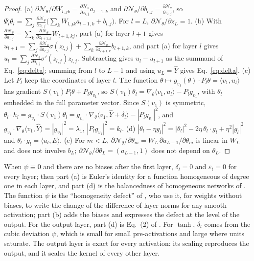 \documentclass[11pt]{article}
\theoremstyle{definition}
\theoremstyle{remark}
\newcommand{\Net}{\mathcal{N}_\theta}
\newcommand{\ip}[2]{\langle #1,#2\rangle}
\begin{document}
\begin{proof}
(a) $\partial\Net/\partial W_{l,jk} = \frac{\partial\Net}{\partial z_{l,j}}a_{l-1,k}$ and $\partial\Net/\partial b_{l,j} = \frac{\partial\Net}{\partial z_{l,j}}$, so $\Psi_l\theta_l = \sum_j\frac{\partial\Net}{\partial z_{l,j}}\big(\sum_kW_{l,jk}a_{l-1,k} + b_{l,j}\big)$. For $l = L$, $\partial\Net/\partial z_L = 1$.
(b) With $\frac{\partial\Net}{\partial a_{l,j}} = \sum_k\frac{\partial\Net}{\partial z_{l+1,k}}W_{l+1,kj}$, part (a) for layer $l+1$ gives $u_{l+1} = \sum_j\frac{\partial\Net}{\partial a_{l,j}}\sigma(z_{l,j}) + \sum_k\frac{\partial\Net}{\partial z_{l+1,k}}b_{l+1,k}$, and part (a) for layer $l$ gives $u_l = \sum_j\frac{\partial\Net}{\partial a_{l,j}}\sigma'(z_{l,j})z_{l,j}$. Subtracting gives $u_l - u_{l+1}$ as the summand of Eq.~\eqref{eq:delta}; summing from $l$ to $L-1$ and using $u_L = \hat Y$ gives Eq.~\eqref{eq:delta}.
(c) Let $P_l$ keep the coordinates of layer $l$. The function $\theta\mapsto g_{v_1}(\theta)\cdot P_l\theta = \ip{v_1}{u_l}$ has gradient $S(v_1)P_l\theta + P_lg_{v_1}$, so $S(v_1)\theta_l = \nabla_\theta\ip{v_1}{u_l} - P_lg_{v_1}$, with $\theta_l$ embedded in the full parameter vector. Since $S(v_1)$ is symmetric, $\theta_l\cdot h_l = g_{v_1}\cdot S(v_1)\theta_l = g_{v_1}\cdot\nabla_\theta\ip{v_1}{\hat Y + \delta_l} - |P_lg_{v_1}|^2$, and $g_{v_1}\cdot\nabla_\theta\ip{v_1}{\hat Y} = |g_{v_1}|^2 = \lambda_1$, $|P_lg_{v_1}|^2 = k_l$.
(d) $|\theta_l - \eta g_l|^2 = |\theta_l|^2 - 2\eta\,\theta_l\cdot g_l + \eta^2|g_l|^2$ and $\theta_l\cdot g_l = \ip{u_l}{E}$.
(e) For $m < L$, $\partial\Net/\partial\theta_m = W_L\,\partial a_{L-1}/\partial\theta_m$ is linear in $W_L$ and does not involve $b_L$; $\partial\Net/\partial\theta_L = (a_{L-1}, 1)$ does not depend on $\theta_L$.
\end{proof}

When $\psi\equiv0$ and there are no biases after the first layer, $\delta_l = 0$ and $\varepsilon_l = 0$ for every layer; then part (a) is Euler's identity for a function homogeneous of degree one in each layer, and part (d) is the balancedness of homogeneous networks of \cite{du2018}.
The function $\psi$ is the ``homogeneity defect'' of \cite{rawal2026}, who use it, for weights without biases, to write the change of the difference of layer norms for any smooth activation; part (b) adds the biases and expresses the defect at the level of the output.
For the output layer, part (d) is Eq.~(2) of \cite{liwangli2022}.
For $\tanh$, $\delta_l$ comes from the cubic deviation $\psi$, which is small for small pre-activations and large where units saturate.
The output layer is exact for every activation: its scaling reproduces the output, and it scales the kernel of every other layer.
\end{document}
